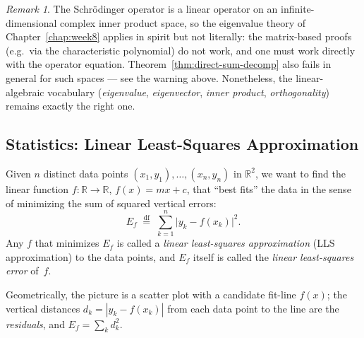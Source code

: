 \documentclass[11pt, a4paper, notitlepage]{report}
\theoremstyle{definition}
\theoremstyle{remark}
\newtheorem{remark}[theorem]{Remark}
\begin{document}
\begin{remark}
The Schr\"odinger operator is a linear operator on an infinite-dimensional
complex inner product space, so the eigenvalue theory of
Chapter~\ref{chap:week8} applies in spirit but not
literally: the matrix-based proofs (e.g.\ via the characteristic polynomial)
do not work, and one must work directly with the operator equation.
Theorem~\ref{thm:direct-sum-decomp} also fails in general for such spaces ---
see the warning above. Nonetheless, the linear-algebraic vocabulary
(\emph{eigenvalue}, \emph{eigenvector}, \emph{inner product}, \emph{orthogonality})
remains exactly the right one.
\end{remark}

\subsection{Statistics: Linear Least-Squares Approximation}
\label{subsec:lls}

Given $n$ distinct data points $(x_1,y_1),\ldots,(x_n,y_n)$ in $\mathbb{R}^2$,
we want to find the linear function $f:\mathbb{R}\to\mathbb{R}$,
$f(x) = mx + c$, that ``best fits'' the data in the sense of minimizing
the sum of squared vertical errors:
\[
  E_f \;\stackrel{\mathrm{df}}{=}\; \sum_{k=1}^{n}\bigl|y_k - f(x_k)\bigr|^2.
\]
Any $f$ that minimizes $E_f$ is called a \emph{linear least-squares
approximation} (LLS approximation) to the data points, and $E_f$ itself is
called the \emph{linear least-squares error} of~$f$.

Geometrically, the picture is a scatter plot with a candidate fit-line
$f(x)$; the vertical distances $d_k = |y_k - f(x_k)|$ from each data point
to the line are the \emph{residuals}, and $E_f = \sum_k d_k^2$.
\end{document}
